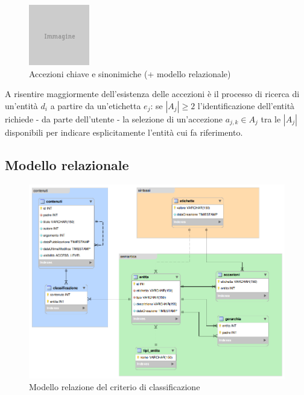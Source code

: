 \begin{figure}[ht]
	\begin{center}
		\includegraphics{placeholder.png}
		\caption{Accezioni chiave e sinonimiche (+ modello relazionale)}
		\label{fig:tesi:stage:classificazione:entita-etichette}
	\end{center}
\end{figure}

A risentire maggiormente dell'esistenza delle accezioni è il processo di ricerca di un'entità $d_i$ a partire da un'etichetta $e_j$: se $\left|A_j\right|\geq 2$ l'identificazione dell'entità richiede - da parte dell'utente - la selezione di un'accezione $a_{j,k} \in A_j$ tra le $\left|A_j\right|$ disponibili per indicare esplicitamente l'entità cui fa riferimento.

\subsection{Modello relazionale}

\begin{figure}[ht]
	\begin{center}
		\includegraphics[width=14.7cm]{modello-er.png}
		\caption{Modello relazione del criterio di classificazione}
		\label{fig:tesi:stage:er:modello}
	\end{center}
\end{figure}

